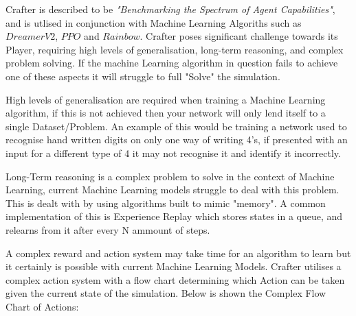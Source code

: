 \begin{flushleft}
                            Crafter is described to be \textit{"Benchmarking the Spectrum of Agent Capabilities"}, and is utlised
                            in conjunction with Machine Learning Algoriths such as $DreamerV2$, $PPO$ and $Rainbow$. Crafter poses significant
                            challenge towards its Player, requiring high levels of generalisation, long-term reasoning, and complex 
                            problem solving. If the machine Learning algorithm in question fails to achieve one of these aspects it will 
                            struggle to full "Solve" the simulation. \\

                            \vspace{0.2cm}

                            High levels of generalisation are required when training a Machine Learning algorithm, if this is not achieved then
                            your network will only lend itself to a single Dataset/Problem. An example of this would be training a network used
                            to recognise hand written digits on only one way of writing 4's, if presented with an input for a different type of 
                            4 it may not recognise it and identify it incorrectly. \\
                            
                            \vspace{0.2cm}

                            Long-Term reasoning is a complex problem to solve in the context of Machine Learning, current Machine Learning models
                            struggle to deal with this problem. This is dealt with by using algorithms built to mimic "memory". A common 
                            implementation of this is Experience Replay which stores states in a queue, and relearns from it after every N ammount
                            of steps. \\

                            \vspace{0.2cm}

                            A complex reward and action system may take time for an algorithm to learn but it certainly is possible with current
                            Machine Learning Models. Crafter utilises a complex action system with a flow chart determining which Action can be taken
                            given the current state of the simulation. Below is shown the Complex Flow Chart of Actions: \\


\end{flushleft}
